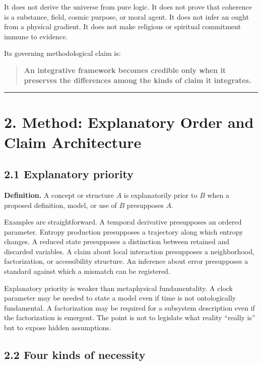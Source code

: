 \documentclass[
  11pt,
]{article}
\begin{document}
It does not derive the universe from pure logic. It does not prove that
coherence is a substance, field, cosmic purpose, or moral agent. It does
not infer an ought from a physical gradient. It does not make religious
or spiritual commitment immune to evidence.

Its governing methodological claim is:

\begin{quote}
\textbf{An integrative framework becomes credible only when it preserves
the differences among the kinds of claim it integrates.}
\end{quote}

\begin{center}\rule{0.5\linewidth}{0.5pt}\end{center}

\section{2. Method: Explanatory Order and Claim
Architecture}\label{method-explanatory-order-and-claim-architecture}

\subsection{2.1 Explanatory priority}\label{explanatory-priority}

\textbf{Definition.} A concept or structure \(A\) is explanatorily prior
to \(B\) when a proposed definition, model, or use of \(B\) presupposes
\(A\).

Examples are straightforward. A temporal derivative presupposes an
ordered parameter. Entropy production presupposes a trajectory along
which entropy changes. A reduced state presupposes a distinction between
retained and discarded variables. A claim about local interaction
presupposes a neighborhood, factorization, or accessibility structure.
An inference about error presupposes a standard against which a mismatch
can be registered.

Explanatory priority is weaker than metaphysical fundamentality. A clock
parameter may be needed to state a model even if time is not
ontologically fundamental. A factorization may be required for a
subsystem description even if the factorization is emergent. The point
is not to legislate what reality ``really is'' but to expose hidden
assumptions.

\subsection{2.2 Four kinds of necessity}\label{four-kinds-of-necessity}
\end{document}
